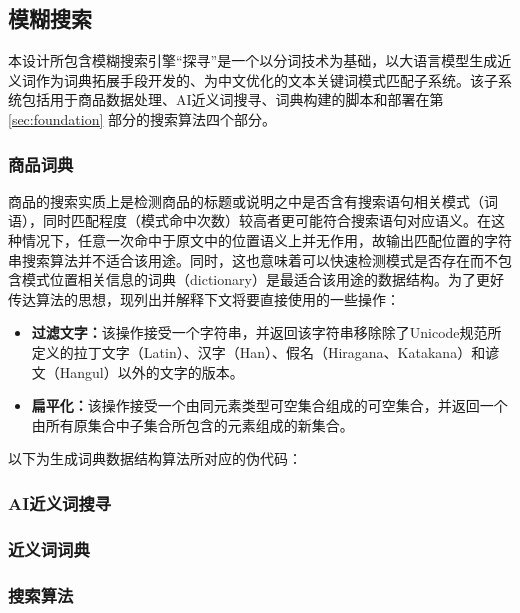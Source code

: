 \subsection{模糊搜索}

本设计所包含模糊搜索引擎“探寻”是一个以分词技术为基础，以大语言模型生成近义词作为词典拓展手段开发的、为中文优化的文本关键词模式匹配子系统。该子系统包括用于商品数据处理、AI近义词搜寻、词典构建的脚本和部署在第 \ref{sec:foundation} 部分的搜索算法四个部分。

\subsubsection{商品词典}

商品的搜索实质上是检测商品的标题或说明之中是否含有搜索语句相关模式（词语），同时匹配程度（模式命中次数）较高者更可能符合搜索语句对应语义。在这种情况下，任意一次命中于原文中的位置语义上并无作用，故输出匹配位置的字符串搜索算法并不适合该用途。同时，这也意味着可以快速检测模式是否存在而不包含模式位置相关信息的词典（dictionary）是最适合该用途的数据结构。为了更好传达算法的思想，现列出并解释下文将要直接使用的一些操作：

\begin{itemize}
	\item \textbf{过滤文字：}该操作接受一个字符串，并返回该字符串移除除了Unicode规范\cite{unicode16.0}所定义的拉丁文字（Latin）、汉字（Han）、假名（Hiragana、Katakana）和谚文（Hangul）以外的文字的版本。
	\item \textbf{扁平化：}该操作接受一个由同元素类型可空集合组成的可空集合，并返回一个由所有原集合中子集合所包含的元素组成的新集合。
\end{itemize}

以下为生成词典数据结构算法所对应的伪代码：

\subsubsection{AI近义词搜寻}

\subsubsection{近义词词典}

\subsubsection{搜索算法}